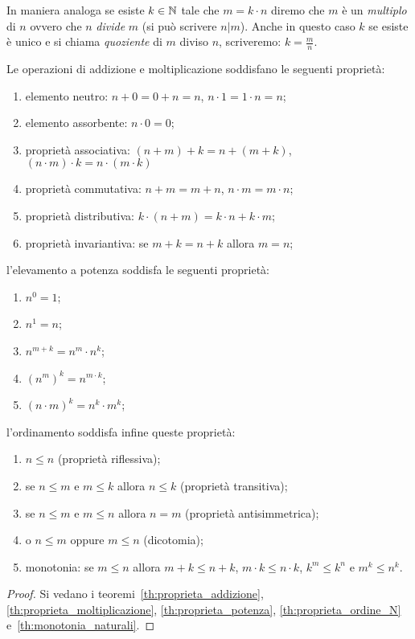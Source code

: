 In maniera analoga se esiste $k\in {\mathbb N}$ tale che $m=k\cdot n$
diremo che $m$ è un \emph{multiplo} di $n$ 
%
ovvero che $n$ \emph{divide} $m$ (si può scrivere $n\vert m$).
Anche in questo caso $k$ se esiste è unico e si 
chiama \emph{quoziente} di $m$ diviso $n$, 
%
scriveremo: $k=\frac m n$.

\begin{theorem}[operazioni su $\NN$]
Le operazioni di addizione e moltiplicazione 
soddisfano le seguenti proprietà:
  \begin{enumerate}
    \item elemento neutro:
      $n + 0 = 0 + n = n$,
      $n\cdot 1 = 1\cdot n = n$;
    \item elemento assorbente:
      $n\cdot 0 = 0$;
    \item proprietà associativa: 
      $(n+m)+k = n+(m+k)$, $(n\cdot m)\cdot k = n \cdot (m\cdot k)$
    \item proprietà commutativa: 
      $n+m = m+n$, $n\cdot m = m\cdot n$;
    \item proprietà distributiva:
     $k\cdot (n+m) = k\cdot n + k\cdot m$;
    \item proprietà invariantiva:
     se $m+k = n+k$ allora $m=n$;
  \end{enumerate}
l'elevamento a potenza soddisfa le seguenti proprietà:
\begin{enumerate}
  \item $n^0 = 1$;
  \item $n^1 = n$;
  \item $n^{m+k} = n^m \cdot n^k$;
  \item $(n^m)^k = n^{m\cdot k}$;
  \item $(n\cdot m)^k = n^k \cdot m^k$;
\end{enumerate}
l'ordinamento soddisfa infine queste proprietà:
\begin{enumerate}
  \item $n\le n$ (proprietà riflessiva);
  \item se $n\le m$ e $m\le k$ allora $n\le k$ (proprietà transitiva);
  \item se $n\le m$ e $m\le n$ allora $n=m$ (proprietà antisimmetrica);
  \item o $n\le m$ oppure $m\le n$ (dicotomia);
  \item monotonia:
   se $m\le n$ allora 
   $m+k\le n+k$, $m\cdot k \le n\cdot k$,
   $k^m \le k^n$ e $m^k \le n^k$. 
\end{enumerate}
\end{theorem}
\begin{proof}
  Si vedano i teoremi~\ref{th:proprieta_addizione},
  \ref{th:proprieta_moltiplicazione},
  \ref{th:proprieta_potenza}, \ref{th:proprieta_ordine_N}
  e~\ref{th:monotonia_naturali}.
\end{proof}

